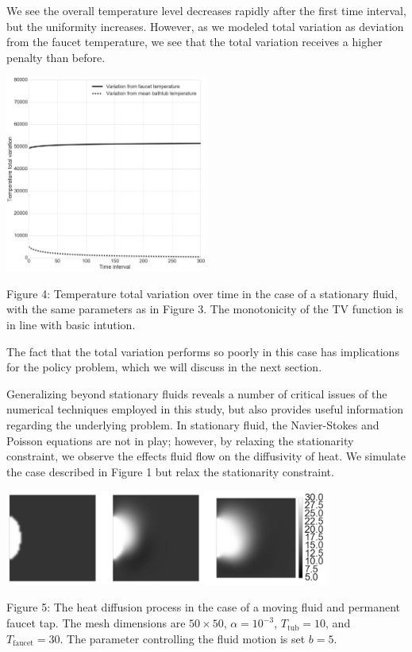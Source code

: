 \documentclass[12pt]{amsart}
\begin{document}
We see the overall temperature level decreases rapidly after the first time
interval, but the uniformity increases.  However, as we modeled total variation
as deviation from the faucet temperature, we see that the total variation
receives a higher penalty than before.

\begin{center}
    \includegraphics[width=0.5\textwidth]{../plots/tv-02.png}

    \justify
    \footnotesize{
    Figure 4: Temperature total variation over time in the case of a stationary
    fluid, with the same parameters as in Figure 3. The monotonicity of the TV
function is in line with basic intution.}
\end{center}
The fact that the total variation performs so poorly in this case has
implications for the policy problem, which we will discuss in the next section.

Generalizing beyond stationary fluids reveals a number of critical issues of the
numerical techniques employed in this study, but also provides useful
information regarding the underlying problem. In stationary fluid, the
Navier-Stokes and Poisson equations are not in play; however, by relaxing the
stationarity constraint, we observe the effects fluid flow on the diffusivity of
heat. We simulate the case described in Figure 1 but relax the stationarity constraint.

\begin{center}
    \includegraphics[width=0.8\textwidth]{../plots/diffusion-03.png}

    \justify
    \footnotesize{
    Figure 5: The heat diffusion process in the case of a moving fluid and
    permanent faucet tap. The mesh dimensions are $50 \times 50$, $\alpha =
    10^{-3}$, $T_{\mathrm{tub}} = 10$, and $T_{\mathrm{faucet}} = 30$. The
parameter controlling the fluid motion is set $b = 5$.}
\end{center}
\end{document}
